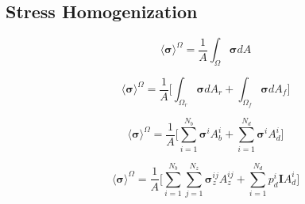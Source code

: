 \subsection{Stress Homogenization}

\begin{equation}
\label{eqn:stress1}
\langle \boldsymbol{\sigma} \rangle^\Omega = 
\frac{1}{A} \int_\Omega \boldsymbol{\sigma} { dA}
\end{equation}

\begin{equation}
\label{eqn:stress2}
\langle \boldsymbol{\sigma} \rangle^\Omega = 
\frac{1}{A} \bigg \lbrack {\int_{\Omega_{r}} \boldsymbol{\sigma} { dA_r} + 
\int_{\Omega_{f}} \boldsymbol{\sigma} { dA_f}} \bigg \rbrack
\end{equation}

\begin{equation}
\label{eqn:stress3}
\langle \boldsymbol{\sigma} \rangle^\Omega = 
\frac{1}{A} \bigg \lbrack \sum_{i=1}^{N_{b}} \boldsymbol{\sigma}^{i} A_{b}^{i} + 
\sum_{i=1}^{N_{d}} \boldsymbol{\sigma}^{i} A_{d}^{i} \bigg \rbrack
\end{equation}

\begin{equation}
\label{eqn:stress4}
\langle \boldsymbol{\sigma} \rangle^\Omega = 
\frac{1}{A} \bigg \lbrack \sum_{i=1}^{N_{b}} \sum_{j=1}^{N_{z}} \boldsymbol{\sigma}_z^{ij} A_{z}^{ij} + 
\sum_{i=1}^{N_{d}} p_d^{i} \textbf{I} A_{d}^{i} \bigg \rbrack
\end{equation}

